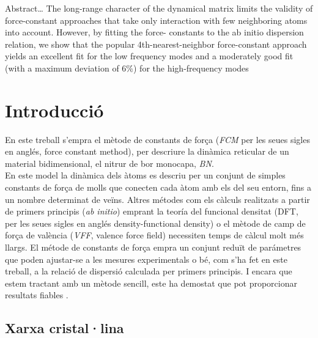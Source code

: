 \documentclass[12pt]{article} %
\begin{document}
\begin{otherlanguage}{english}\itshape

\noindent Abstract\ldots
The long-range character of the dynamical matrix limits the validity of
force-constant approaches that take only interaction with few neighboring atoms into account. However, by fitting the force-
constants to the ab initio dispersion relation, we show that the popular 4th-nearest-neighbor force-constant approach yields an
excellent fit for the low frequency modes and a moderately good fit (with a 
maximum deviation of $6 \%$) for the high-frequency modes \cite{wirtz04_phonon_disper_graph_revis}
\end{otherlanguage}



\section{Introducció}

En este treball s'empra el mètode de constants de força (\emph{FCM} per les seues sigles en anglés, \foreignlanguage{english}{force constant method}), per descriure la dinàmica reticular de un material bidimensional, el nitrur de bor monocapa, \emph{BN}.\\

En este model la dinàmica dels àtoms es descriu per un conjunt de simples constants de força de molls que conecten cada àtom amb els del seu entorn, fins a un nombre determinat de veïns. Altres métodes com els càlculs realitzats a partir de primers principis (\emph{ab initio}) emprant la teoría del funcional densitat (DFT, per les seues sigles en anglés \foreignlanguage{english}{density-functional density}) o el mètode de camp de força de valència (\emph{VFF}, \foreignlanguage{english}{valence force field}) necessiten temps de càlcul molt més llargs. El métode de constants de força empra un conjunt reduït de parámetres que poden ajustar-se a les mesures experimentals o bé, com s'ha fet en este treball, a la relació de dispersió calculada per primers principis.  I encara que estem tractant amb un mètode sencill, este ha demostat que pot proporcionar resultats fiables \cite{wirtz04_phonon_disper_graph_revis}.


\subsection{Xarxa cristal·lina}
\end{document}

